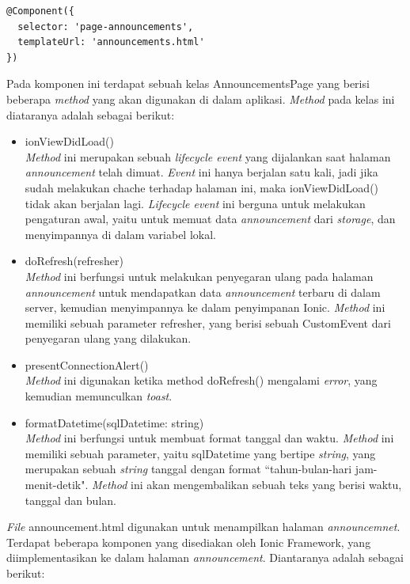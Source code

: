 \begin{enumerate}
\begin{enumerate}
\begin{lstlisting}[label={lst:componentannouncement}, caption=@Component pada annoncement.ts]
@Component({
  selector: 'page-announcements',
  templateUrl: 'announcements.html'
})
\end{lstlisting} 
	Pada komponen ini terdapat sebuah kelas AnnouncementsPage yang berisi beberapa \textit{method} yang akan digunakan di dalam aplikasi. \textit{Method} pada kelas ini diataranya adalah sebagai berikut:
	\begin{itemize}
		\item ionViewDidLoad() \\
		\textit{Method} ini merupakan sebuah \textit{lifecycle event} yang dijalankan saat halaman \textit{announcement} telah dimuat. \textit{Event} ini hanya berjalan satu kali, jadi jika sudah melakukan chache terhadap halaman ini, maka ionViewDidLoad() tidak akan berjalan lagi. \textit{Lifecycle event} ini berguna untuk melakukan pengaturan awal, yaitu untuk memuat data \textit{announcement} dari \textit{storage}, dan menyimpannya di dalam variabel lokal. 
		\item doRefresh(refresher) \\
		\textit{Method} ini berfungsi untuk melakukan penyegaran ulang pada halaman \textit{announcement} untuk mendapatkan data \textit{announcement} terbaru di dalam server, kemudian menyimpannya ke dalam penyimpanan Ionic. \textit{Method} ini memiliki sebuah parameter refresher, yang berisi sebuah CustomEvent dari penyegaran ulang yang dilakukan.
		\item presentConnectionAlert() \\
		\textit{Method} ini digunakan ketika method doRefresh() mengalami \textit{error}, yang kemudian memunculkan \textit{toast}.
		\item formatDatetime(sqlDatetime: string) \\
		\textit{Method} ini berfungsi untuk membuat format tanggal dan waktu. \textit{Method} ini memiliki sebuah parameter, yaitu sqlDatetime yang bertipe \textit{string}, yang merupakan sebuah \textit{string} tanggal dengan format ``tahun-bulan-hari jam-menit-detik". \textit{Method} ini akan mengembalikan sebuah teks yang berisi waktu, tanggal dan bulan.
	\end{itemize}

	\textit{File} announcement.html digunakan untuk menampilkan halaman \textit{announcemnet}. Terdapat beberapa komponen yang disediakan oleh Ionic Framework, yang diimplementasikan ke dalam halaman \textit{announcement}. Diantaranya adalah sebagai berikut:	
	

\end{enumerate}
\end{enumerate}
